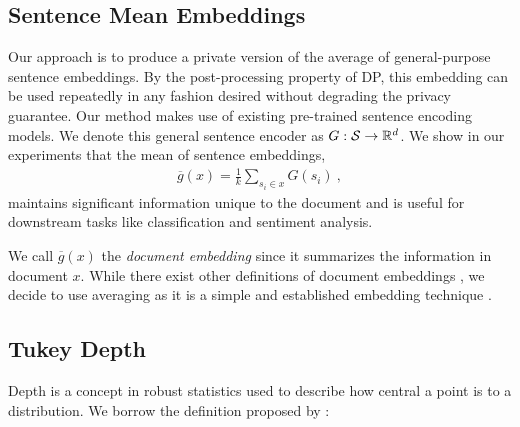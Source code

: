 \subsection{Sentence Mean Embeddings} 

Our approach is to produce a private version of the average of general-purpose sentence embeddings. By the post-processing property of DP, this embedding can be used repeatedly in any fashion desired without degrading the privacy guarantee. Our method makes use of existing pre-trained sentence encoding models. We denote this general sentence encoder as $G : \mathcal{S} \rightarrow {\mathbb R}^d$. We show in our experiments that the mean of sentence embeddings,  
\begin{align}
	\overline{g}(x) = \frac{1}{k} \sum_{s_i \in x} G(s_i) \ , 
	\label{eqn: doc emb}
\end{align}
maintains significant information unique to the document and is useful for downstream tasks like classification and sentiment analysis.

We call $\overline{g}(x)$ the \emph{document embedding} since it summarizes the information in document $x$. While there exist other definitions of document embeddings \cite{yang2016hierarchical, thongtan2019sentiment, bianchi2020pre}, we decide to use averaging as it is a simple and established embedding technique \cite{bojanowski2017enriching, gupta2019better, li2020sentence}.
\subsection{Tukey Depth}
Depth is a concept in robust statistics used to describe how central a point is to a distribution. We borrow the definition proposed by \citet{tukeydepth}:

